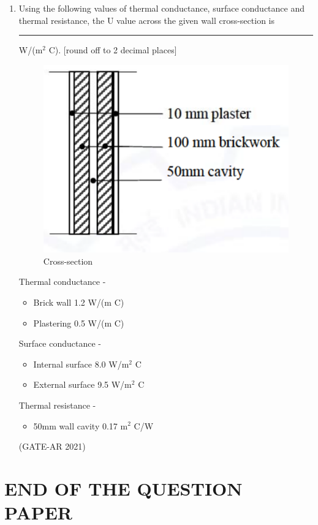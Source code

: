 \documentclass[a4paper,10pt]{article}
\begin{document}
\begin{enumerate}
    \item Using the following values of thermal conductance, surface conductance and thermal resistance, the U value across the given wall cross-section is \rule{2cm}{0.4pt} W/(m$^2$ \textdegree C). [round off to 2 decimal places] \\
    \begin{figure}[h!]
    \centering
    \includegraphics[width=0.5\columnwidth]{figs/12.jpg}
    \caption{Cross-section}
    \label{fig:Img12}
    \end{figure}
    \newpage
    Thermal conductance - \\
    \begin{itemize}
    \item Brick wall 1.2 W/(m \textdegree C)
    \item Plastering 0.5 W/(m \textdegree C)
    \end{itemize}
    Surface conductance - \\
    \begin{itemize}
    \item Internal surface 8.0 W/m$^2$ \textdegree C
    \item External surface 9.5 W/m$^2$ \textdegree C
    \end{itemize}
    Thermal resistance - \\
    \begin{itemize}
    \item 50mm wall cavity 0.17 m$^2$ \textdegree C/W
    \end{itemize}
    \hfill (GATE-AR 2021)
    
\end{enumerate}

\centering
\section*{END OF THE QUESTION PAPER}
\end{document}
